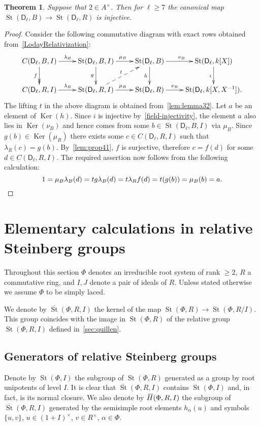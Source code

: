 \documentclass[oneside, 8pt]{amsart}
\newtheorem{externaltheorem}[lemma]{Theorem}
\theoremstyle{remark}
\theoremstyle{definition}
\numberwithin{lemma}{section}
\numberwithin{prop}{section}
\numberwithin{corollary}{section}
\numberwithin{externaltheorem}{section}
\DeclareMathOperator{\Ker}{Ker}
\DeclareMathOperator{\St}{St}
\newcommand{\myol}[2][3]{{}\mkern#1mu\overline{\mkern-#1mu#2}}
\newcommand{\rD}{\mathsf{D}}
\numberwithin{equation}{section}
\begin{document}
\begin{externaltheorem} \label{thm41} Suppose that $2 \in A^\times$. Then for $\ell \geq 7$ the canonical map $\St(\rD_\ell, B) \to \St(\rD_\ell, R)$ is injective. \end{externaltheorem}
\begin{proof}
 Consider the following commutative diagram with exact rows obtained from~\eqref{LodayRelativization}:
\begin{equation*} \xymatrix{
 C(\rD_\ell, B, I) \ar[r]^{\lambda_B} \ar@{->>}[d]_{f} & \St(\rD_\ell, B, I) \ar[r]^{\mu_B} \ar[d]_{g} &
 \St(\rD_\ell, B) \ar[r]^{\nu_B} \ar[d]_{h} & \St(\rD_\ell, k[X]) \ar[d]_{i} \\
 C(\rD_\ell, R, I) \ar[r]^{\lambda_R}         & \St(\rD_\ell, R, I) \ar[r]^{\mu_R} \ar@{-->}[ur]^{t}&
 \St(\rD_\ell, R) \ar[r]^-{\nu_R}        & \St(\rD_\ell, k[X, X^{-1}]).
}\end{equation*}
The lifting $t$ in the above diagram is obtained from~\cref{lem:lemma32}.
Let $a$ be an element of $\Ker(h)$. Since $i$ is injective by~\cref{field-injectivity}, the element $a$
 also lies in $\Ker(\nu_B)$ and hence comes from some $b \in \St(\rD_\ell, B, I)$ via $\mu_B$.
Since $g(b) \in \Ker(\mu_R)$ there exists some $c \in C(\rD_\ell, R, I)$ such that $\lambda_R(c) = g(b)$. 
By~\cref{lem:prop41}, $f$ is surjective, therefore $c = f(d)$ for some $d \in C(\rD_\ell, R, I)$.
The required assertion now follows from the following calculation:
 \[ 1 = \mu_B\lambda_B(d) = tg\lambda_B(d) = t\lambda_Rf(d) =t(g(b)) = \mu_B(b) = a. \qedhere \]
\end{proof}

\section{Elementary calculations in relative Steinberg groups}\label{sec:elementary}
Throughout this section $\Phi$ denotes an irreducible root system of rank $\geq 2$, $R$ a commutative ring, and $I, J$ denote a pair of ideals of $R$.
Unless stated otherwise we assume $\Phi$ to be simply laced.

We denote by $\overline{\St}(\Phi, R, I)$ the kernel of the map $\St(\Phi, R) \to \St(\Phi, R/I)$.
This group coincides with the image in $\St(\Phi, R)$ of the relative group $\St(\Phi, R, I)$ defined in~\cref{sec:quillen}.

\subsection{Generators of relative Steinberg groups}
Denote by $\St(\Phi, I)$ the subgroup of $\St(\Phi, R)$ generated as a group by root unipotents of level $I$.
It is clear that $\overline{\St}(\Phi, R, I)$ contains $\St(\Phi, I)$ and, in fact, is its normal closure.
We also denote by $\myol{H}(\Phi, R, I)$ the subgroup of $\overline{\St}(\Phi, R, I)$ generated by the semisimple root elements $h_\alpha(u)$ and symbols $\{u, v\}$, $u \in (1+I)^\times$, $v \in R^\times$, $\alpha\in \Phi$.
\end{document}
